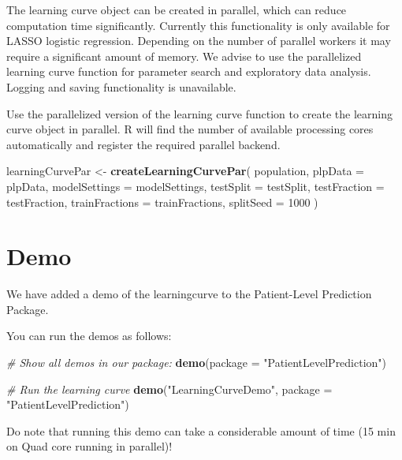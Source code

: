 \documentclass[]{article}
\newenvironment{Shaded}{\begin{snugshade}}{\end{snugshade}}
\newcommand{\KeywordTok}[1]{\textcolor[rgb]{0.13,0.29,0.53}{\textbf{#1}}}
\newcommand{\DataTypeTok}[1]{\textcolor[rgb]{0.13,0.29,0.53}{#1}}
\newcommand{\DecValTok}[1]{\textcolor[rgb]{0.00,0.00,0.81}{#1}}
\newcommand{\StringTok}[1]{\textcolor[rgb]{0.31,0.60,0.02}{#1}}
\newcommand{\CommentTok}[1]{\textcolor[rgb]{0.56,0.35,0.01}{\textit{#1}}}
\newcommand{\NormalTok}[1]{#1}
\begin{document}
The learning curve object can be created in parallel, which can reduce
computation time significantly. Currently this functionality is only
available for LASSO logistic regression. Depending on the number of
parallel workers it may require a significant amount of memory. We
advise to use the parallelized learning curve function for parameter
search and exploratory data analysis. Logging and saving functionality
is unavailable.

Use the parallelized version of the learning curve function to create
the learning curve object in parallel. R will find the number of
available processing cores automatically and register the required
parallel backend.

\begin{Shaded}
\begin{Highlighting}[]
\NormalTok{learningCurvePar <-}\StringTok{ }\KeywordTok{createLearningCurvePar}\NormalTok{(}
\NormalTok{  population,}
  \DataTypeTok{plpData =}\NormalTok{  plpData,}
  \DataTypeTok{modelSettings =}\NormalTok{ modelSettings,}
  \DataTypeTok{testSplit =}\NormalTok{ testSplit,}
  \DataTypeTok{testFraction =}\NormalTok{ testFraction,}
  \DataTypeTok{trainFractions =}\NormalTok{ trainFractions,}
  \DataTypeTok{splitSeed =} \DecValTok{1000}
\NormalTok{)}
\end{Highlighting}
\end{Shaded}

\section{Demo}\label{demo}

We have added a demo of the learningcurve to the Patient-Level
Prediction Package.

You can run the demos as follows:

\begin{Shaded}
\begin{Highlighting}[]
\CommentTok{# Show all demos in our package: }
 \KeywordTok{demo}\NormalTok{(}\DataTypeTok{package =} \StringTok{"PatientLevelPrediction"}\NormalTok{)}

\CommentTok{# Run the learning curve}
 \KeywordTok{demo}\NormalTok{(}\StringTok{"LearningCurveDemo"}\NormalTok{, }\DataTypeTok{package =} \StringTok{"PatientLevelPrediction"}\NormalTok{)}
\end{Highlighting}
\end{Shaded}

Do note that running this demo can take a considerable amount of time
(15 min on Quad core running in parallel)!
\end{document}
